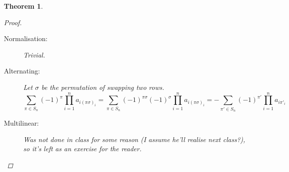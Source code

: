 \documentclass{article}
\newtheorem{theorem}{Theorem}
\theoremstyle{definition}
\begin{document}
\begin{theorem}
\begin{proof}
\begin{description}
			\begin{description}
				\item[Normalisation:] Trivial.
				\item[Alternating:] Let $\sigma$ be the permutation of swapping two rows. \\
					$$\sum_{\pi\in S_n}(-1)^\pi\prod_{i=1}^na_{i(\pi\sigma)_i}=\sum_{\pi\in S_n}(-1)^{\pi\sigma}(-1)^\sigma\prod_{i=1}^na_{i(\pi\sigma)_i}=-\sum_{\pi'\in S_n}(-1)^{\pi'}\prod_{i=1}^na_{i\pi'_i}$$
				\item[Multilinear:] Was not done in class for some reason (I assume he'll realise next class?), so it's left as an exercise for the reader.
			\end{description}
		\end{description}
	\end{proof}
\end{theorem}
\end{document}
